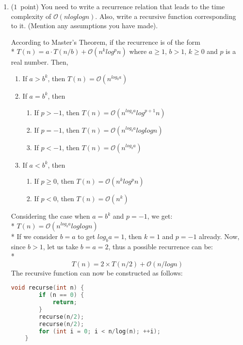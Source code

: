 \documentclass[14pt]{article}
\begin{document}
\begin{enumerate}[label=\alph*)]
    \item ($1$\ point)
    You need to write a recurrence relation that leads to the time complexity of $\mathcal{O}(nloglogn)$. Also, write a recursive function corresponding to it. (Mention any assumptions you have made).
    \begin{myframe}[width=500pt,height=320pt,top=2pt,bottom=2.5pt,left=2pt,right=2pt,arc=10pt,auto outer arc]
    According to Master's Theorem, if the recurrence is of the form \\* $T(n) = a \cdot T(n/b) + \mathcal{O}(n^k log^p n)$ where $a \geq 1$, $b > 1$, $k \geq 0$ and $p$ is a real number. Then, 
    \begin{enumerate}
        \item If $a > b^k$, then $T(n) = \mathcal{O}(n^{log_{b}a})$
        \item If $a = b^k$, then 
        \begin{enumerate}
            \item If $p > -1$, then $T(n) = \mathcal{O}(n^{log_{b}a}log^{p+1}n)$
            \item If $p = -1$, then $T(n) = \mathcal{O}(n^{log_{b}a}log log n)$
            \item If $p < -1$, then $T(n) = \mathcal{O}(n^{log_{b}a})$
        \end{enumerate}
        \item If $a < b^k$, then
        \begin{enumerate}
            \item If $p \geq 0$, then $T(n) = \mathcal{O}(n^k log^p n)$
            \item If $p < 0$, then $T(n) = \mathcal{O}(n^k)$
        \end{enumerate}
    \end{enumerate}
    \end{myframe}
    
    \begin{myframe}[width=500pt,height=320pt,top=2pt,bottom=2.5pt,left=2pt,right=2pt,arc=10pt,auto outer arc]
    Considering the case when $a = b^k$ and $p = -1$, we get: \\*
    $T(n) = \mathcal{O}(n^{log_{b}a}log log n)$ \\*
    If we consider $b = a$ to get $log_{b}a = 1$, then $k = 1$ and $p = -1$ already. Now, since $b > 1$, let us take $b = a = 2$, thus a possible recurrence can be: \\*
    \[ T(n) = 2 \times T(n/2) + \mathcal{O}(n/logn) \]
    The recursive function can now be constructed as follows:
    \begin{lstlisting}[language=C++, title={Part (f)}]
    void recurse(int n) {
        if (n == 0) {
            return;
        }
        recurse(n/2);
        recurse(n/2);
        for (int i = 0; i < n/log(n); ++i);
    }
    \end{lstlisting}
    \end{myframe}
\end{enumerate}
\end{document}
